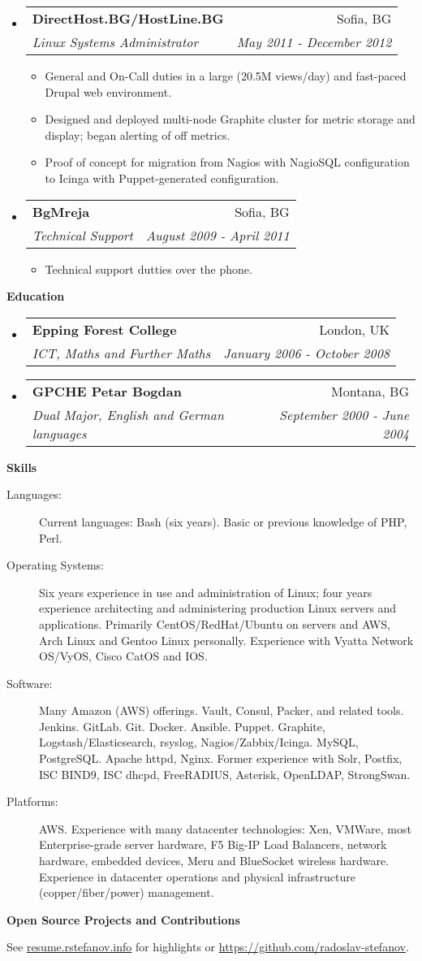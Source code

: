 \documentclass[letterpaper,11pt]{article}
\makeatletter
\newcommand{\resitem}[1]{\item #1 \vspace{-2pt}}
\newcommand{\resheading}[1]{{\large \colorbox{mygrey}{\begin{minipage}{\textwidth}{\textbf{#1 \vphantom{p\^{E}}}}\end{minipage}}}}
\newcommand{\ressubheading}[4]{
\begin{tabular*}{7.0in}{l@{\extracolsep{\fill}}r}
		\textbf{#1} & #2 \\
		\textit{#3} & \textit{#4} \\
\end{tabular*}\vspace{-6pt}}
\makeatother
\begin{document}
\begin{itemize}
\item
	\ressubheading{DirectHost.BG/HostLine.BG}{Sofia, BG}{Linux Systems Administrator}{May 2011 - December 2012}
	\begin{itemize}
                \resitem{General and On-Call duties in a large (20.5M views/day) and fast-paced Drupal web environment.}
                \resitem{Designed and deployed multi-node Graphite cluster for metric storage and display; began alerting of off metrics.}
                \resitem{Proof of concept for migration from Nagios with NagioSQL configuration to Icinga with Puppet-generated configuration.}
	\end{itemize}

\item
	\ressubheading{BgMreja}{Sofia, BG}{Technical Support}{August 2009 - April 2011}
	\begin{itemize}
                \resitem{Technical support dutties over the phone.}
	\end{itemize}
\end{itemize}

\resheading{Education}
\begin{itemize}
\item
	\ressubheading{Epping Forest College}{London, UK}{ICT, Maths and Further Maths}{January 2006 - October 2008}

\item
  \ressubheading{GPCHE Petar Bogdan}{Montana, BG}{Dual Major, English and German languages}{September 2000 - June 2004}
\end{itemize}

\resheading{Skills}

\begin{description}
\item[Languages:]
Current languages: Bash (six years). Basic or previous knowledge of PHP, Perl.
\item[Operating Systems:]
Six years experience in use and administration of Linux; four years experience architecting and administering production Linux servers and applications.
Primarily CentOS/RedHat/Ubuntu on servers and AWS, Arch Linux and Gentoo Linux personally. Experience with Vyatta Network OS/VyOS, Cisco CatOS and IOS.
\item[Software:]
Many Amazon (AWS) offerings. Vault, Consul, Packer, and related tools. Jenkins. GitLab. Git. Docker. Ansible. Puppet. Graphite, Logstash/Elasticsearch, rsyslog, Nagios/Zabbix/Icinga. MySQL, PostgreSQL. Apache httpd, Nginx.
Former experience with Solr, Postfix, ISC BIND9, ISC dhcpd, FreeRADIUS, Asterisk, OpenLDAP, StrongSwan.

\item[Platforms:]
AWS. Experience with many datacenter technologies: Xen, VMWare, most Enterprise-grade server hardware, F5 Big-IP Load Balancers, network hardware, embedded devices, Meru and BlueSocket wireless hardware. Experience in datacenter operations and physical infrastructure (copper/fiber/power) management.
\end{description}

\resheading{Open Source Projects and Contributions}
\begin{description}
\item{See \href{http://resume.rstefanov.info}{resume.rstefanov.info} for highlights or \href{https://github.com/radoslav-stefanov}{https://github.com/radoslav-stefanov}.}
\end{description}
\end{document}
